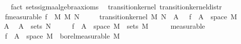 \begin{isabellebody}
\ \ \ \ \isamarkupfalse%
\ {\isacharparenleft}{\kern0pt}fact\ sets{\isachardot}{\kern0pt}sigma{\isacharunderscore}{\kern0pt}algebra{\isacharunderscore}{\kern0pt}axioms{\isacharparenright}{\kern0pt}\isanewline
{}\isamarkupfalse%
%
\endisatagproof
{\isafoldproof}%
%
\isadelimproof
\isanewline
%
\endisadelimproof
\isanewline
{}\isamarkupfalse%
\ {\isacharparenleft}{\kern0pt}\ transition{\isacharunderscore}{\kern0pt}kernel{\isacharparenright}{\kern0pt}\ transition{\isacharunderscore}{\kern0pt}kernel{\isacharunderscore}{\kern0pt}distr{\isacharcolon}{\kern0pt}\isanewline
\ \ \ \ f{\isacharbrackleft}{\kern0pt}measurable{\isacharbrackright}{\kern0pt}{\isacharcolon}{\kern0pt}\ {\isachardoublequoteopen}f\ {\isasymin}\ M{\isacharprime}{\kern0pt}\ {\isasymrightarrow}\isactrlsub M\ N{\isacharprime}{\kern0pt}{\isachardoublequoteclose}\isanewline
\ \ \ \ \ {\isachardoublequoteopen}transition{\isacharunderscore}{\kern0pt}kernel\ M\ N{\isacharprime}{\kern0pt}\ {\isacharparenleft}{\kern0pt}{\isasymlambda}{\isasymomega}\ A{\isacharprime}{\kern0pt}{\isachardot}{\kern0pt}\ {\isasymkappa}\ {\isasymomega}\ {\isacharparenleft}{\kern0pt}f\ {\isacharminus}{\kern0pt}{\isacharbackquote}{\kern0pt}\ A{\isacharprime}{\kern0pt}\ {\isasyminter}\ space\ M{\isacharprime}{\kern0pt}{\isacharparenright}{\kern0pt}{\isacharparenright}{\kern0pt}{\isachardoublequoteclose}\isanewline
%
\isadelimproof
%
\endisadelimproof
%
\isatagproof
{}\isamarkupfalse%
\isanewline
\ \ \isamarkupfalse%
\ A{\isacharprime}{\kern0pt}\ \isamarkupfalse%
\ {\isachardoublequoteopen}A{\isacharprime}{\kern0pt}\ {\isasymin}\ sets\ N{\isacharprime}{\kern0pt}{\isachardoublequoteclose}\isanewline
\ \ \isamarkupfalse%
\ \isamarkupfalse%
\ {\isachardoublequoteopen}f\ {\isacharminus}{\kern0pt}{\isacharbackquote}{\kern0pt}\ A{\isacharprime}{\kern0pt}\ {\isasyminter}\ space\ M{\isacharprime}{\kern0pt}\ {\isasymin}\ sets\ M{\isacharprime}{\kern0pt}{\isachardoublequoteclose}\isanewline
\ \ \ \ \isamarkupfalse%
\ measurable\isanewline
\ \ \isamarkupfalse%
\ \isamarkupfalse%
\ {\isachardoublequoteopen}{\isacharparenleft}{\kern0pt}{\isasymlambda}{\isasymomega}{\isachardot}{\kern0pt}\ {\isasymkappa}\ {\isasymomega}\ {\isacharparenleft}{\kern0pt}f\ {\isacharminus}{\kern0pt}{\isacharbackquote}{\kern0pt}\ A{\isacharprime}{\kern0pt}\ {\isasyminter}\ space\ M{\isacharprime}{\kern0pt}{\isacharparenright}{\kern0pt}{\isacharparenright}{\kern0pt}\ {\isasymin}\ borel{\isacharunderscore}{\kern0pt}measurable\ M{\isachardoublequoteclose}\isanewline

\end{isabellebody}
